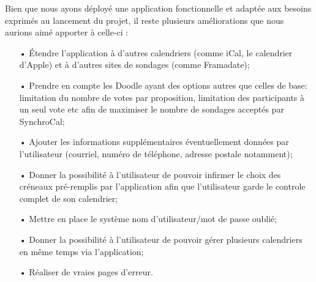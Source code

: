 Bien que nous ayons déployé une application fonctionnelle et adaptée aux besoins exprimés au lancement du projet, il reste plusieurs améliorations que nous aurions aimé apporter à celle-ci :
\newline
\begin{enumerate}
\item[•] Étendre l'application à d'autres calendriers (comme iCal, le calendrier d'Apple) et à d'autres sites de sondages (comme Framadate);
\item[•] Prendre en compte les Doodle ayant des options autres que celles de base: limitation du nombre de votes par proposition, limitation des participants à un seul vote etc afin de maximiser le nombre de sondages acceptés par SynchroCal;
\item[•] Ajouter les informations supplémentaires éventuellement données par l'utilisateur (courriel, numéro de téléphone, adresse postale notamment);
\item[•] Donner la possibilité à l'utilisateur  de pouvoir infirmer le choix des créneaux pré-remplis par l'application afin que l'utilisateur garde le controle complet de son calendrier;
\item[•] Mettre en place le système nom d'utilisateur/mot de passe oublié;
\item[•] Donner la possibilité à l'utilisateur de pouvoir gérer plusieurs calendriers en même temps via l'application;
\item[•] Réaliser de vraies pages d'erreur.


\end{enumerate}
\bigbreak
